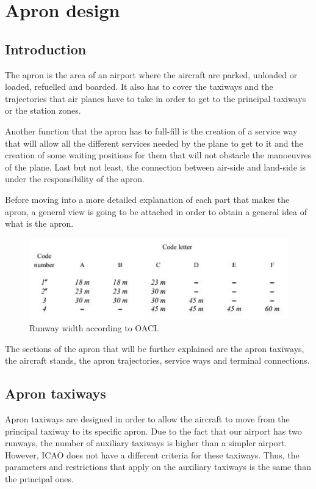 \chapter{Apron design}

	\section{Introduction}
	The apron is the area of an airport where the aircraft are parked, unloaded or loaded, refuelled and boarded. It also has to cover the taxiways and the trajectories that air planes have to take in order to get to the principal taxiways or the station zones.  
	
	Another function that the apron has to full-fill is the creation of a service way that will allow all the different services needed by the plane to get to it and the creation of some waiting positions for them that will not obstacle the manoeuvres of the plane. Last but not least, the connection between air-side and land-side is under the responsibility of the apron. 
	
	Before moving into a more detailed explanation of each part that makes the apron, a general view is going to be attached in order to obtain a general idea of what is the apron.
	
	\begin{figure}[H]
		\centering
		\includegraphics[clip, trim=0cm 0cm 0cm 0cm, width=1\textwidth]{./images/Annex14/RunwayWidth}
		\caption{Runway width according to OACI.} %
		\label{} %
	\end{figure}
	
	
	The sections of the apron that will be further explained are the apron taxiways, the aircraft stands, the apron trajectories, service ways and terminal connections. 
	
	\section{Apron taxiways}
	Apron taxiways are designed in order to allow the aircraft to move from the principal taxiway to its specific apron. Due to the fact that our airport has two runways, the number of auxiliary taxiways is higher than a simpler airport. However, ICAO does not have a different criteria for these taxiways. Thus, the parameters and restrictions that apply on the auxiliary taxiways is the same than the principal ones.
	
